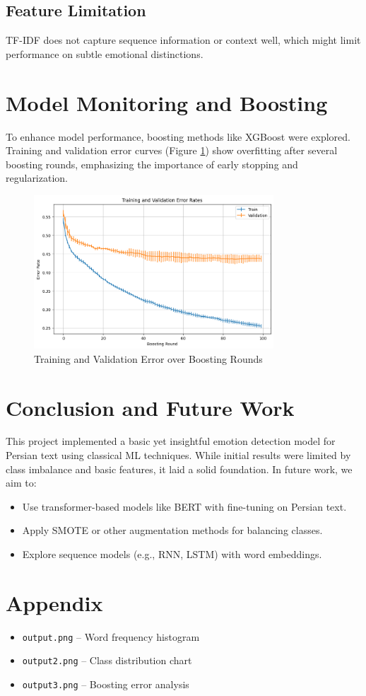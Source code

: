 \documentclass[12pt]{article}
\begin{document}
\subsection{Feature Limitation}
TF-IDF does not capture sequence information or context well, which might limit performance on subtle emotional distinctions.

\section{Model Monitoring and Boosting}
To enhance model performance, boosting methods like XGBoost were explored. Training and validation error curves (Figure \ref{fig:boosting}) show overfitting after several boosting rounds, emphasizing the importance of early stopping and regularization.

\begin{figure}[H]
    \centering
    \includegraphics[width=0.8\textwidth]{output3.png}
    \caption{Training and Validation Error over Boosting Rounds}
    \label{fig:boosting}
\end{figure}

\section{Conclusion and Future Work}
This project implemented a basic yet insightful emotion detection model for Persian text using classical ML techniques. While initial results were limited by class imbalance and basic features, it laid a solid foundation. In future work, we aim to:
\begin{itemize}
    \item Use transformer-based models like BERT with fine-tuning on Persian text.
    \item Apply SMOTE or other augmentation methods for balancing classes.
    \item Explore sequence models (e.g., RNN, LSTM) with word embeddings.
\end{itemize}

\section*{Appendix}
\begin{itemize}
    \item \texttt{output.png} – Word frequency histogram
    \item \texttt{output2.png} – Class distribution chart
    \item \texttt{output3.png} – Boosting error analysis
\end{itemize}
\end{document}
